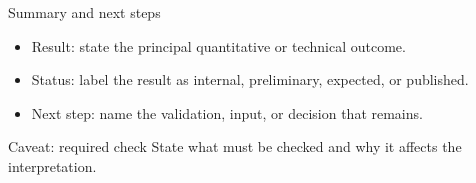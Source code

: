 \documentclass[aspectratio=169,10pt,xcolor={table,dvipsnames}]{beamer}
\begin{document}
\begin{frame}{Summary and next steps}
\begin{itemize}
  \item Result: state the principal quantitative or technical outcome.
  \item Status: label the result as internal, preliminary, expected, or published.
  \item Next step: name the validation, input, or decision that remains.
\end{itemize}
\begin{alertblock}{Caveat: required check}
State what must be checked and why it affects the interpretation.
\end{alertblock}
\end{frame}
\end{document}
